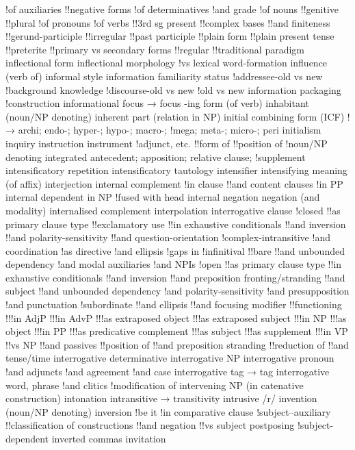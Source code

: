 !of auxiliaries
!!negative forms
!of determinatives
!and grade
!of nouns
!!genitive
!!plural
!of pronouns
!of verbs
!!3rd sg present
!!complex bases
!!and finiteness
!!gerund-participle
!!irregular
!!past participle
!!plain form
!!plain present tense
!!preterite
!!primary vs secondary forms
!!regular
!!traditional paradigm
inflectional form
inflectional morphology
!vs lexical word-formation
influence (verb of)
informal style
information familiarity status
!addressee-old vs new
!background knowledge
!discourse-old vs new
!old vs new
information packaging
!construction
informational focus → focus
-ing form (of verb)
inhabitant (noun/NP denoting)
inherent part (relation in NP)
initial combining form (ICF)
!→ archi; endo-; hyper-; hypo-; macro-;
!mega; meta-; micro-; peri
initialism
inquiry
instruction
instrument
!adjunct, etc.
!!form of
!!position of
!noun/NP denoting
integrated antecedent; apposition; relative clause;
!supplement
intensificatory repetition
intensificatory tautology
intensifier
intensifying meaning (of affix)
interjection
internal complement
!in clause
!!and content clauses
!in PP
internal dependent in NP
!fused with head
internal negation negation (and modality)
internalised complement
interpolation
interrogative clause
!closed
!!as primary clause type
!!exclamatory use
!!in exhaustive conditionals
!!and inversion
!!and polarity-sensitivity
!!and question-orientation
!complex-intransitive
!and coordination
!as directive
!and ellipsis
!gaps in
!infinitival
!!bare
!!and unbounded dependency
!and modal auxiliaries
!and NPIs
!open
!!as primary clause type
!!in exhaustive conditionals
!!and inversion
!!and preposition fronting/stranding
!!and subject
!!and unbounded dependency
!and polarity-sensitivity
!and presupposition
!and punctuation
!subordinate
!!and ellipsis
!!and focusing modifier
!!functioning
!!!in AdjP
!!!in AdvP
!!!as extraposed object
!!!as extraposed subject
!!!in NP
!!!as object
!!!in PP
!!!as predicative complement
!!!as subject
!!!as supplement
!!!in VP
!!vs NP
!!and passives
!!position of
!!and preposition stranding
!!reduction of
!!and tense/time
interrogative determinative
interrogative NP
interrogative pronoun
!and adjuncts
!and agreement
!and case
interrogative tag → tag
interrogative word, phrase
!and clitics
!modification of
intervening NP (in catenative construction)
intonation
intransitive → transitivity
intrusive /r/
invention (noun/NP denoting)
inversion
!be it
!in comparative clause
!subject--auxiliary
!!classification of constructions
!!and negation
!!vs subject postposing
!subject-dependent
inverted commas
invitation
